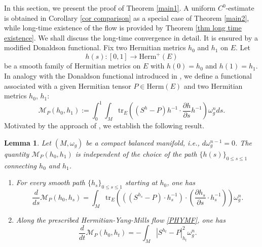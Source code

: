 \documentclass[12pt, reqno]{amsart}
\newcommand\cM{{\mathcal M}}
\theoremstyle{plain}
\newtheorem{lemma}[thm]{Lemma}
\theoremstyle{definition}
\newcommand{\elemma}{\end{lemma}}
\newcommand{\blemma}{\begin{lemma}}
\newcommand{\p}{\partial}
\newcommand{\beq}{\begin{equation}}
\newcommand{\eeq}{\end{equation}}
\newcommand{\bd}{\begin{enumerate}}
\newcommand{\ed}{\end{enumerate}}
\renewcommand{\>}{\rightarrow}
\renewcommand{\>}{\rightarrow}
\renewcommand{\p}{{\partial}}
\newcommand{\om}{\omega}
\newcommand{\tr}{\mathrm{tr}}
\numberwithin{equation}{section} %
\begin{document}
In this section, we present the proof of Theorem \ref{main1}. A uniform $C^0$-estimate  is obtained in Corollary \ref{cor comparison} as a special case of Theorem \ref{main2}, while long-time existence of the flow is provided by Theorem \ref{thm long time existence}. We shall discuss the long-time convergence in detail. It is ensured by a modified Donaldson functional.
Fix two Hermitian metrics $h_0$ and $h_1$ on $E$.
Let $$h(s):[0,1]\>\mathrm{Herm}^+(E)$$ be a smooth family of Hermitian metrics on $E$  with $h(0)=h_0$ and $h(1)=h_1$. In analogy with the Donaldson functional introduced in \cite{Don85}, 
we define a functional associated with a given Hermitian tensor 
$P \in \mathrm{Herm}(E)$ and two Hermitian metrics $h_0$, $h_1$:
\beq
\cM_P(h_0,h_1)
:=\int_0^1\int_M\tr_E\left(\left(S^h-P\right) h^{-1}\cdot\frac{\p h}{\p s}h^{-1}\right)\om_g^n ds.
\label{path definition MP}
\eeq
Motivated by the approach of \cite{Don85}, we establish the following result.
\blemma\label{Pfunctional}   Let $(M,\omega_g)$ be a compact balanced manifold, i.e.,  $d\omega^{n-1}_g=0$. The quantity $\cM_P(h_0,h_1)$ is independent of the choice of the path $\{h(s)\}_{0\leq s\leq1}$ connecting $h_0$ and $h_1$.  \bd
\item  For every smooth path $\{h_s\}_{0\leq s\leq1}$ starting at $h_0$, one has
\beq
\frac{d}{ds}\cM_P(h_0,h_s)
=\int_M\tr_E\left(
\left((S^{h_s}-P)\cdot h_s^{-1}\right)
\cdot\left(\frac{\p h_s}{\p s}\cdot h_s^{-1}\right)
\right)\om_g^n.
\label{Donaldson first variation}
\eeq

\item Along the prescribed Hermitian-Yang-Mills  flow \eqref{PHYMF}, one has
\beq\frac{d}{dt}\cM_P(h_0,h_t)=
-\int_M\left|S^{h_t}-P\right|_{h_t}^2\om_g^n.
\label{modified Donaldson Lyapunov identity}
\eeq
\ed
\elemma
\end{document}
